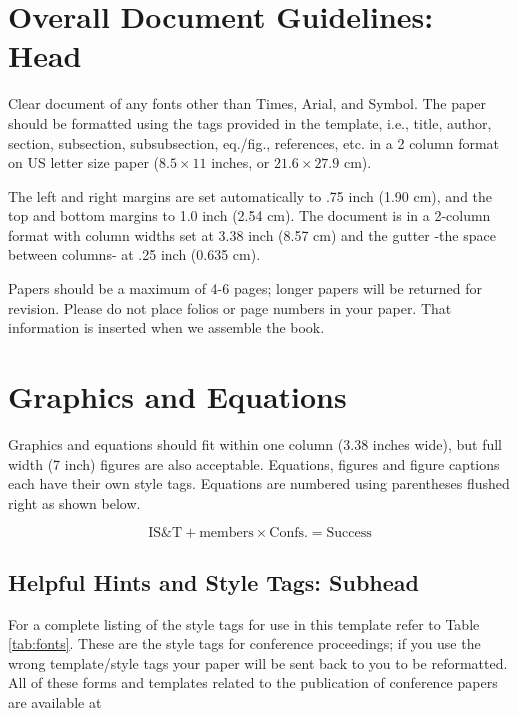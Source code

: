 \documentclass[letterpaper,twocolumn,fleqn]{article}
\begin{document}
\section{Overall Document Guidelines: Head}
\label{sec:intro}

Clear document of any fonts other than Times, Arial, and Symbol. The
paper should be formatted using the tags provided in the template,
i.e., title, author, section, subsection, subsubsection, eq./fig.,
references, etc.  in a 2 column format on US letter size paper ($8.5
\times 11$ inches, or $21.6 \times 27.9$ cm).

The left and right margins are set automatically to .75 inch (1.90 cm),
and the top and bottom margins to 1.0 inch (2.54 cm). The document is in
a 2-column format with column widths set at 3.38 inch (8.57 cm) and the
gutter -the space between columns- at .25 inch (0.635 cm).

Papers should be a maximum of 4-6 pages; longer papers will be
returned for revision. Please do not place folios or page numbers in
your paper. That information is inserted when we assemble the book.


\section{Graphics and Equations}
Graphics and equations should fit within one column (3.38 inches
wide), but full width (7 inch) figures are also acceptable. Equations,
figures and figure captions each have their own style tags. Equations
are numbered using parentheses flushed right as shown below.

\begin{equation}
\label{eq:ist}
\textrm{IS\&T} + \textrm{members} \times \textrm{Confs.} = \textrm{Success}
\end{equation}


\subsection{Helpful Hints and Style Tags: Subhead}
For a complete listing of the style tags for use in this template
refer to Table \ref{tab:fonts}. These are the style tags for
conference proceedings; if you use the wrong template/style tags your
paper will be sent back to you to be reformatted.  All of these forms
and templates related to the publication of conference papers are
available at
\end{document}
